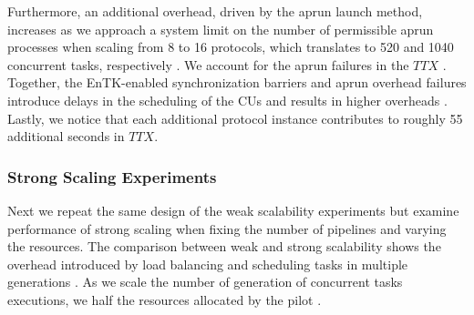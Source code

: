 Furthermore, an additional overhead, driven by the aprun  launch method, increases as we
approach a system limit on the number of permissible 
aprun processes when scaling from 8 to 16 protocols, which translates to 520
and 1040 concurrent tasks, respectively . We account for the aprun failures in the \(TTX\)
. Together, the EnTK-enabled
synchronization barriers and aprun overhead failures  introduce delays in the scheduling of the CUs
and results in higher overheads . Lastly, we notice that
each additional protocol instance contributes to roughly 55 additional
seconds in \(TTX\).

\subsubsection{Strong Scaling Experiments}


Next we repeat the same design of the weak scalability experiments but
examine performance of strong scaling when fixing the number of pipelines and
varying the resources. The comparison between weak and strong scalability
shows the overhead introduced by load balancing and scheduling tasks in
multiple generations . As we scale the number of generation of concurrent tasks
executions, we half the resources allocated by the pilot .

